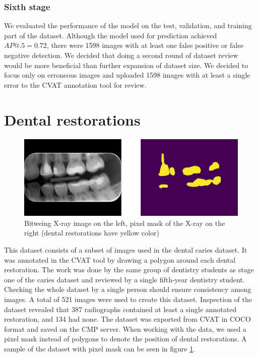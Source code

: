 \subsubsection{Sixth stage}
We evaluated the performance of the model on the test, validation, and training part of the dataset. Although the model used for prediction achieved $AP@.5 = 0.72$, there were 1598 images with at least one false positive or false negative detection. We decided that doing a second round of dataset review would be more beneficial than further expansion of dataset size. We decided to focus only on erroneous images and uploaded 1598 images with at least a single error to the CVAT annotation tool for review.


\section{Dental restorations}
\begin{figure}
    \centering
    \includegraphics[width=\linewidth]{images/segmentation_ds_sample.pdf}
    \caption{Bitweing X-ray image on the left, pixel mask of the X-ray on the right (dental restorations have yellow color)}
    \label{fig:segmentation_sample}
\end{figure}
This dataset consists of a subset of images used in the dental caries dataset. It was annotated in the CVAT tool by drawing a polygon around each dental restoration. The work was done by the same group of dentistry students as stage one of the caries dataset and reviewed by a single fifth-year dentistry student. Checking the whole dataset by a single person should ensure consistency among images. A total of 521 images were used to create this dataset. Inspection of the dataset revealed that 387 radiographs contained at least a single annotated restoration, and 134 had none.
The dataset was exported from CVAT in COCO format and saved on the CMP server. When working with the data, we used a pixel mask instead of polygons to denote the position of dental restorations. A sample of the dataset with pixel mask can be seen in figure \ref{fig:segmentation_sample}.

